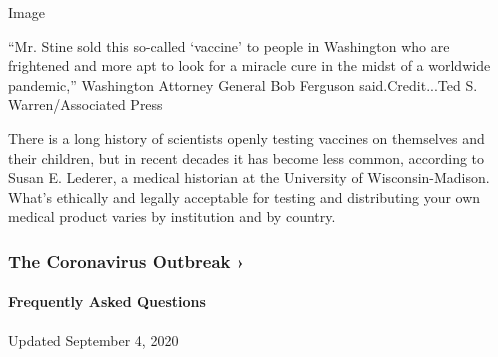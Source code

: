 Image

``Mr. Stine sold this so-called `vaccine' to people in Washington who
are frightened and more apt to look for a miracle cure in the midst of a
worldwide pandemic,'' Washington Attorney General Bob Ferguson
said.Credit...Ted S. Warren/Associated Press

There is a long history of scientists openly testing vaccines on
themselves and their children, but in recent decades it has become less
common, according to Susan E. Lederer, a medical historian at the
University of Wisconsin-Madison. What's ethically and legally acceptable
for testing and distributing your own medical product varies by
institution and by country.

\href{https://www.nytimes3xbfgragh.onion/news-event/coronavirus?action=click\&pgtype=Article\&state=default\&region=MAIN_CONTENT_3\&context=storylines_faq}{}

\hypertarget{the-coronavirus-outbreak-}{%
\subsubsection{The Coronavirus Outbreak
›}\label{the-coronavirus-outbreak-}}

\hypertarget{frequently-asked-questions}{%
\paragraph{Frequently Asked
Questions}\label{frequently-asked-questions}}

Updated September 4, 2020

